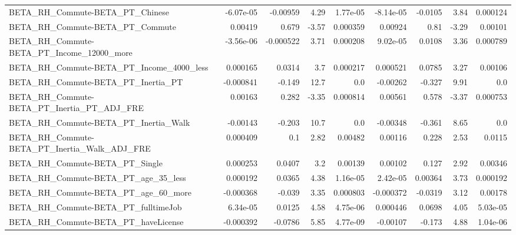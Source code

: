 \begin{tabular}{lrrrrrrrr}
BETA\_RH\_Commute-BETA\_PT\_Chinese                    &   -6.07e-05 &     -0.00959 &     4.29 & 1.77e-05 &  -8.14e-05 &     -0.0105 &         3.84 &      0.000124 \\
BETA\_RH\_Commute-BETA\_PT\_Commute                    &     0.00419 &        0.679 &    -3.57 & 0.000359 &    0.00924 &        0.81 &        -3.29 &       0.00101 \\
BETA\_RH\_Commute-BETA\_PT\_Income\_12000\_more          &   -3.56e-06 &    -0.000522 &     3.71 & 0.000208 &   9.02e-05 &      0.0108 &         3.36 &      0.000789 \\
BETA\_RH\_Commute-BETA\_PT\_Income\_4000\_less           &    0.000165 &       0.0314 &      3.7 & 0.000217 &   0.000521 &      0.0785 &         3.27 &       0.00106 \\
BETA\_RH\_Commute-BETA\_PT\_Inertia\_PT                 &   -0.000841 &       -0.149 &     12.7 &      0.0 &   -0.00262 &      -0.327 &         9.91 &           0.0 \\
BETA\_RH\_Commute-BETA\_PT\_Inertia\_PT\_ADJ\_FRE         &     0.00163 &        0.282 &    -3.35 & 0.000814 &    0.00561 &       0.578 &        -3.37 &      0.000753 \\
BETA\_RH\_Commute-BETA\_PT\_Inertia\_Walk               &    -0.00143 &       -0.203 &     10.7 &      0.0 &   -0.00348 &      -0.361 &         8.65 &           0.0 \\
BETA\_RH\_Commute-BETA\_PT\_Inertia\_Walk\_ADJ\_FRE       &    0.000409 &          0.1 &     2.82 &  0.00482 &    0.00116 &       0.228 &         2.53 &        0.0115 \\
BETA\_RH\_Commute-BETA\_PT\_Single                     &    0.000253 &       0.0407 &      3.2 &  0.00139 &    0.00102 &       0.127 &         2.92 &       0.00346 \\
BETA\_RH\_Commute-BETA\_PT\_age\_35\_less                &    0.000192 &       0.0365 &     4.38 & 1.16e-05 &   2.42e-05 &     0.00364 &         3.73 &      0.000192 \\
BETA\_RH\_Commute-BETA\_PT\_age\_60\_more                &   -0.000368 &       -0.039 &     3.35 & 0.000803 &  -0.000372 &     -0.0319 &         3.12 &       0.00178 \\
BETA\_RH\_Commute-BETA\_PT\_fulltimeJob                &    6.34e-05 &       0.0125 &     4.58 & 4.75e-06 &   0.000446 &      0.0698 &         4.05 &      5.03e-05 \\
BETA\_RH\_Commute-BETA\_PT\_haveLicense                &   -0.000392 &      -0.0786 &     5.85 & 4.77e-09 &   -0.00107 &      -0.173 &         4.88 &      1.04e-06 \\

\end{tabular}
